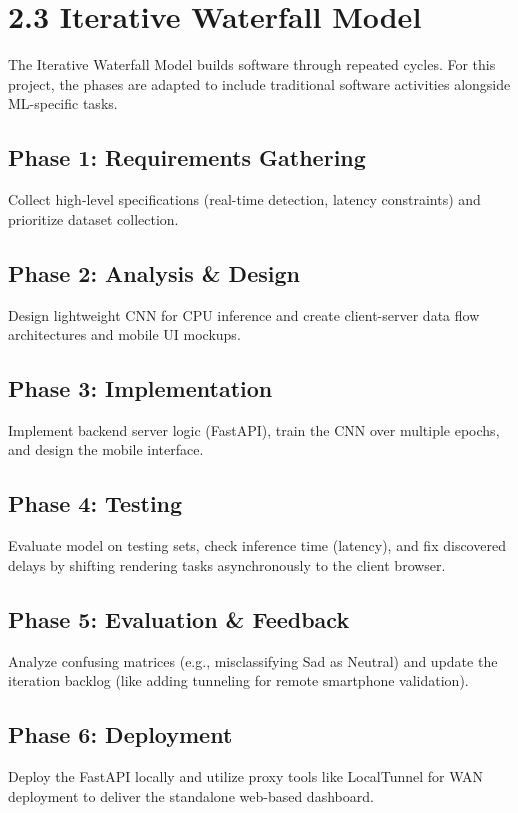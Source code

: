 \documentclass[12pt,a4paper]{report}
\begin{document}
\section*{2.3 Iterative Waterfall Model }

The Iterative Waterfall Model builds software through repeated cycles. For this project, the phases are adapted to include traditional software activities alongside ML-specific tasks.

\subsection*{Phase 1: Requirements Gathering}
Collect high-level specifications (real-time detection, latency constraints) and prioritize dataset collection.

\subsection*{Phase 2: Analysis \& Design}
Design lightweight CNN for CPU inference and create client-server data flow architectures and mobile UI mockups.

\subsection*{Phase 3: Implementation}
Implement backend server logic (FastAPI), train the CNN over multiple epochs, and design the mobile interface.

\subsection*{Phase 4: Testing}
Evaluate model on testing sets, check inference time (latency), and fix discovered delays by shifting rendering tasks asynchronously to the client browser.

\subsection*{Phase 5: Evaluation \& Feedback}
Analyze confusing matrices (e.g., misclassifying Sad as Neutral) and update the iteration backlog (like adding tunneling for remote smartphone validation).

\subsection*{Phase 6: Deployment}
Deploy the FastAPI locally and utilize proxy tools like LocalTunnel for WAN deployment to deliver the standalone web-based dashboard.
\end{document}
